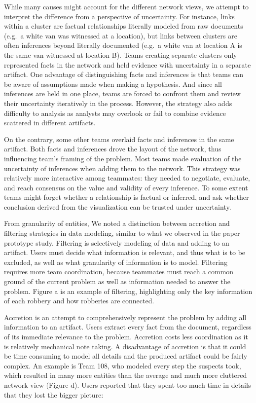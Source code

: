 \documentclass[]{article}
\begin{document}
While many causes might account for the different network views, we
attempt to interpret the difference from a perspective of uncertainty.
For instance, links within a cluster are factual relationships literally
modeled from raw documents (e.g.~a white van was witnessed at a
location), but links between clusters are often inferences beyond
literally documented (e.g.~a white van at location A is the same van
witnessed at location B). Teams creating separate clusters only
represented facts in the network and held evidence with uncertainty in a
separate artifact. One advantage of distinguishing facts and inferences
is that teams can be aware of assumptions made when making a hypothesis.
And since all inferences are held in one place, teams are forced to
confront them and review their uncertainty iteratively in the process.
However, the strategy also adds difficulty to analysis as analysts may
overlook or fail to combine evidence scattered in different artifacts.

On the contrary, some other teams overlaid facts and inferences in the
same artifact. Both facts and inferences drove the layout of the
network, thus influencing team's framing of the problem. Most teams made
evaluation of the uncertainty of inferences when adding them to the
network. This strategy was relatively more interactive among teammates:
they needed to negotiate, evaluate, and reach consensus on the value and
validity of every inference. To some extent teams might forget whether a
relationship is factual or inferred, and ask whether conclusion derived
from the visualization can be trusted under uncertainty.

From granularity of entities, We noted a distinction between accretion
and filtering strategies in data modeling, similar to what we observed
in the paper prototype study. Filtering is selectively modeling of data
and adding to an artifact. Users must decide what information is
relevant, and thus what is to be excluded, as well as what granularity
of information is to model. Filtering requires more team coordination,
because teammates must reach a common ground of the current problem as
well as information needed to answer the problem. Figure
\autocite{fig:network}a is an example of filtering, highlighting only
the key information of each robbery and how robberies are connected.

Accretion is an attempt to comprehensively represent the problem by
adding all information to an artifact. Users extract every fact from the
document, regardless of its immediate relevance to the problem.
Accretion costs less coordination as it is relatively mechanical note
taking. A disadvantage of accretion is that it could be time consuming
to model all details and the produced artifact could be fairly complex.
An example is Team 108, who modeled every step the suspects took, which
resulted in many more entities than the average and much more cluttered
network view (Figure \autocite{fig:network}d). Users reported that they
spent too much time in details that they lost the bigger picture:
\end{document}
